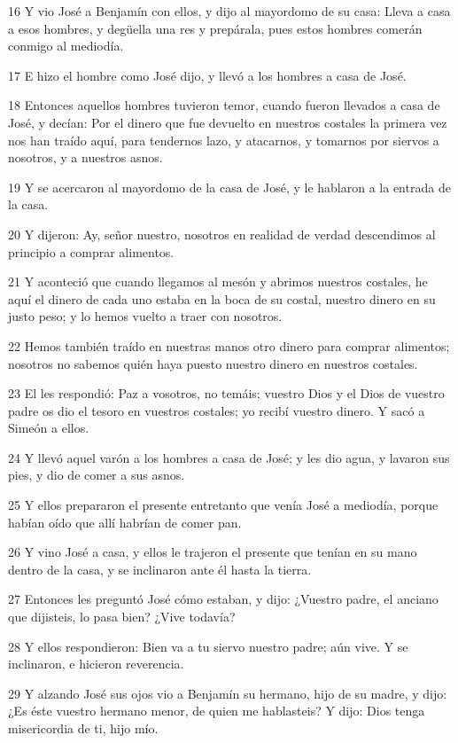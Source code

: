 16 Y vio José a Benjamín con ellos, y dijo al mayordomo de su casa: Lleva a casa a esos hombres, y degüella una res y prepárala, pues estos hombres comerán conmigo al mediodía.

17 E hizo el hombre como José dijo, y llevó a los hombres a casa de José.

18 Entonces aquellos hombres tuvieron temor, cuando fueron llevados a casa de José, y decían: Por el dinero que fue devuelto en nuestros costales la primera vez nos han traído aquí, para tendernos lazo, y atacarnos, y tomarnos por siervos a nosotros, y a nuestros asnos.

19 Y se acercaron al mayordomo de la casa de José, y le hablaron a la entrada de la casa.

20 Y dijeron: Ay, señor nuestro, nosotros en realidad de verdad descendimos al principio a comprar alimentos.

21 Y aconteció que cuando llegamos al mesón y abrimos nuestros costales, he aquí el dinero de cada uno estaba en la boca de su costal, nuestro dinero en su justo peso; y lo hemos vuelto a traer con nosotros.

22 Hemos también traído en nuestras manos otro dinero para comprar alimentos; nosotros no sabemos quién haya puesto nuestro dinero en nuestros costales.

23 El les respondió: Paz a vosotros, no temáis; vuestro Dios y el Dios de vuestro padre os dio el tesoro en vuestros costales; yo recibí vuestro dinero. Y sacó a Simeón a ellos.

24 Y llevó aquel varón a los hombres a casa de José; y les dio agua, y lavaron sus pies, y dio de comer a sus asnos.

25 Y ellos prepararon el presente entretanto que venía José a mediodía, porque habían oído que allí habrían de comer pan.

26 Y vino José a casa, y ellos le trajeron el presente que tenían en su mano dentro de la casa, y se inclinaron ante él hasta la tierra.

27 Entonces les preguntó José cómo estaban, y dijo: ¿Vuestro padre, el anciano que dijisteis, lo pasa bien? ¿Vive todavía?

28 Y ellos respondieron: Bien va a tu siervo nuestro padre; aún vive. Y se inclinaron, e hicieron reverencia.

29 Y alzando José sus ojos vio a Benjamín su hermano, hijo de su madre, y dijo: ¿Es éste vuestro hermano menor, de quien me hablasteis? Y dijo: Dios tenga misericordia de ti, hijo mío.


